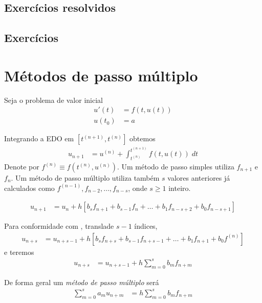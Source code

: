 \subsection*{Exercícios resolvidos}

\emconstrucao

\subsection*{Exercícios}

\emconstrucao

\section{Métodos de passo múltiplo}
Seja o problema de valor inicial
\begin{eqnarray}
  u'(t) &= f(t,u(t)) \\
  u(t_0) &= a
\end{eqnarray}


Integrando a EDO em $[t^{(n+1)},t^{(n)}]$ obtemos
\begin{eqnarray}
  u_{n+1}  &= u^{(n)}  + \int _{t^{(n)}}^{t^{(n+1)}} f(t,u(t)) \; dt
\end{eqnarray}
Denote por $f^{(n)}\equiv f(t^{(n)},u^{(n)})$. Um método de passo simples utiliza $f_{n+1}$ e $f_{n}$. Um método de passo múltiplo utiliza também $s$ valores anteriores já calculados como $f^{(n-1)},f_{n-2},\ldots ,f_{n-s}$, onde $s\geq 1$ inteiro.

\begin{eqnarray}
  u_{n+1}  &= u_{n}  + h[b_s f_{n+1}+b_{s-1}f_{n}+\ldots +b_1f_{n-s+2}+b_0f_{n-s+1}]
\end{eqnarray}

Para conformidade com \cite{iserles2009first}, translade $s-1$ índices,
\begin{eqnarray}
  u_{n+s}  &= u_{n+s-1}  + h[b_s f_{n+s}+b_{s-1}f_{n+s-1}+\ldots +b_1f_{n+1}+b_0f^{(n)}] \label{multiad}
\end{eqnarray}
e teremos
\begin{eqnarray}
  u_{n+s}  &= u_{n+s-1}  + h \sum_{m=0}^s b_m f_{n+m}
\end{eqnarray}

De forma geral um \emph{método de passo múltiplo} será
\begin{eqnarray}
  \sum_{m=0}^s a_m u_{n+m}  &=  h \sum_{m=0}^s b_m f_{n+m}
\end{eqnarray}

